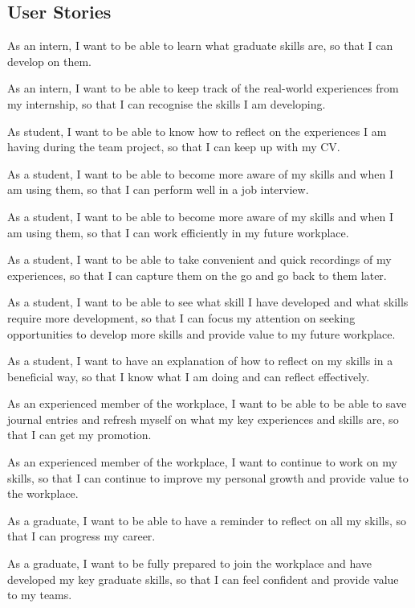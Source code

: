 \documentclass{l4proj}
\begin{document}
\begin{appendices}
%

\section{User Stories} \label{Appendix-userStories}

As an intern, I want to be able to learn what graduate skills are, so that I can develop on them.

As an intern, I want to be able to keep track of the real-world experiences from my internship, so that I can recognise the skills I am developing.

As student, I want to be able to know how to reflect on the experiences I am having during the team project, so that I can keep up with my CV.

As a student, I want to be able to become more aware of my skills and when I am using them, so that I can perform well in a job interview.

As a student, I want to be able to become more aware of my skills and when I am using them, so that I can work efficiently in my future workplace.

As a student, I want to be able to take convenient and quick recordings of my experiences, so that I can capture them on the go and go back to them later.

As a student, I want to be able to see what skill I have developed and what skills require more development, so that I can focus my attention on seeking opportunities to develop more skills and provide value to my future workplace.

As a student, I want to have an explanation of how to reflect on my skills in a beneficial way, so that I know what I am doing and can reflect effectively.

As an experienced member of the workplace, I want to be able to be able to save journal entries and refresh myself on what my key experiences and skills are, so that I can get my promotion.

As an experienced member of the workplace, I want to continue to work on my skills, so that I can continue to improve my personal growth and provide value to the workplace.

As a graduate, I want to be able to have a reminder to reflect on all my skills, so that I can progress my career.

As a graduate, I want to be fully prepared to join the workplace and have developed my key graduate skills, so that I can feel confident and provide value to my teams.


\end{appendices}
\end{document}
